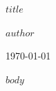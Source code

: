\documentclass[a4paper]{article}
\begin{document}
\begin{titlepage}
    \vspace*{-1cm}
    \vspace{2cm}
    
    \begin{flushleft}
    {\fontsize{60}{72}\selectfont\textbf{$title$}\par}
    \vspace{0.5cm}
    
    {\Large $author$\par}
    \vspace{1cm}
    
    \vfill
    {\large \today\par}
    \end{flushleft}
\end{titlepage}

\tableofcontents
\newpage

$body$
\end{document}
